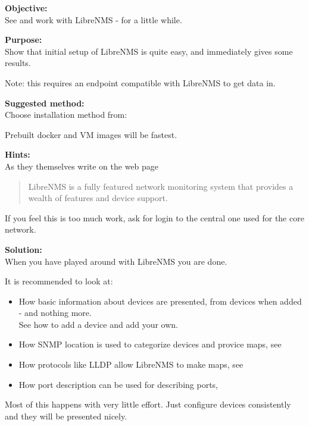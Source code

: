 \documentclass[a4paper,11pt,notitlepage]{report}
\begin{document}
{\bf Objective:}\\
See and work with LibreNMS - for a little while.


{\bf Purpose:}\\
Show that initial setup of LibreNMS is quite easy, and immediately gives some results.

Note: this requires an endpoint compatible with LibreNMS to get data in.

{\bf Suggested method:}\\
Choose installation method from:\\

Prebuilt docker and VM images will be fastest.

{\bf Hints:}\\
As they themselves write on the web page 

\begin{quote}
LibreNMS is a fully featured network monitoring system that provides a wealth of features and device support.
\end{quote}

If you feel this is too much work, ask for login to the central one used for the core network.

{\bf Solution:}\\
When you have played around with LibreNMS you are done.

It is recommended to look at:
\begin{itemize}
\item How basic information about devices are presented, from devices when added - and nothing more.\\
See how to add a device and add your own. 
\item How SNMP location is used to categorize devices and provice maps, see 
\item How protocols like LLDP allow LibreNMS to make maps, see 
\item How port description can be used for describing ports, 
\end{itemize}

Most of this happens with very little effort. Just configure devices consistently and they will be presented nicely.
\end{document}
